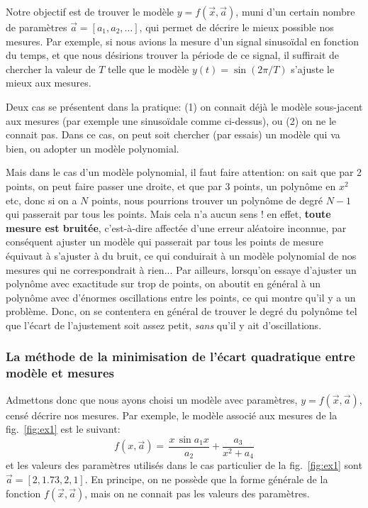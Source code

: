 \documentclass[main.tex]{subfiles}
\begin{document}
Notre objectif est de trouver le modèle $y=f(\vec{x},\vec{a})$, muni d'un certain nombre de paramètres $\vec{a}=[a_1,a_2,\dots]$, qui permet de décrire le mieux possible nos mesures. Par exemple, si nous avions la mesure d'un signal sinusoïdal en fonction du temps, et que nous désirions trouver la période de ce signal, il suffirait de chercher la valeur de $T$ telle que le modèle $y(t)=\sin{(2\pi/T)}$ s'ajuste le mieux aux mesures.

Deux cas se présentent dans la pratique: (1) on connait déjà le modèle sous-jacent aux mesures (par exemple une sinusoïdale comme ci-dessus), ou (2) on ne le connait pas. Dans ce cas, on peut soit chercher (par essais) un modèle qui va bien, ou adopter un modèle polynomial.

Mais dans le cas d'un modèle polynomial, il faut faire attention: on sait que par 2 points, on peut faire passer une droite, et que par 3 points, un polynôme en $x^2$ etc, donc si on a $N$ points, nous pourrions trouver un polynôme de degré $N-1$ qui passerait par tous les points. Mais cela n'a aucun sens ! en effet, \textbf{toute mesure est bruitée}, c'est-à-dire affectée d'une erreur aléatoire inconnue, par conséquent ajuster un modèle qui passerait par tous les points de mesure équivaut à s'ajuster à du bruit, ce qui conduirait à un modèle polynomial de nos mesures qui ne correspondrait à rien... Par ailleurs, lorsqu'on essaye d'ajuster un polynôme avec exactitude sur trop de points, on aboutit en général à un polynôme avec d'énormes oscillations entre les points, ce qui montre qu'il y a un problème. Donc, on se contentera en général de trouver le degré du polynôme tel que l'écart de l'ajustement soit assez petit, \textit{sans} qu'il y ait d'oscillations.

\subsubsection{La méthode de la minimisation de l'écart quadratique entre modèle et mesures}

Admettons donc que nous ayons choisi un modèle avec paramètres, $y=f(\vec{x},\vec{a})$, censé décrire nos mesures. Par exemple, le modèle associé aux mesures de la fig.~\ref{fig:ex1} est le suivant:
\begin{equation}
    f(x,\vec{a})=\,\frac{x\,\sin{a_1x}}{a_2}+\frac{a_3}{x^2+a_4}
\end{equation}
et les valeurs des paramètres utilisés dans le cas particulier de la fig.~\ref{fig:ex1} sont $\vec{a}=[2,1.73,2,1]$. En principe, on ne possède que la forme générale de la fonction $f(\vec{x},\vec{a})$, mais on ne connait pas les valeurs des paramètres.
\end{document}

